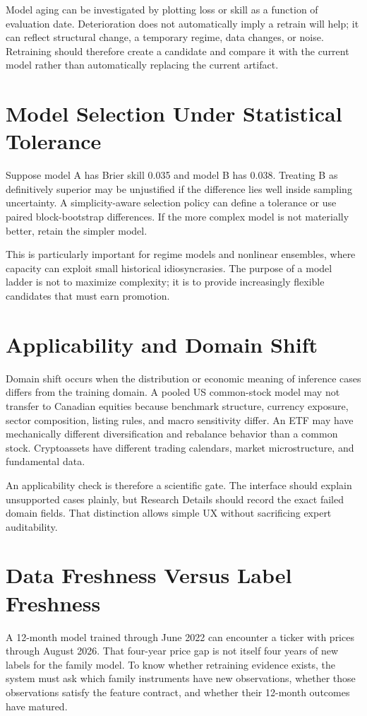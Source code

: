 \documentclass[11pt]{article}
\begin{document}
Model aging can be investigated by plotting loss or skill as a function of evaluation date. Deterioration does not automatically imply a retrain will help; it can reflect structural change, a temporary regime, data changes, or noise. Retraining should therefore create a candidate and compare it with the current model rather than automatically replacing the current artifact.

\section{Model Selection Under Statistical Tolerance}
Suppose model A has Brier skill 0.035 and model B has 0.038. Treating B as definitively superior may be unjustified if the difference lies well inside sampling uncertainty. A simplicity-aware selection policy can define a tolerance or use paired block-bootstrap differences. If the more complex model is not materially better, retain the simpler model.

This is particularly important for regime models and nonlinear ensembles, where capacity can exploit small historical idiosyncrasies. The purpose of a model ladder is not to maximize complexity; it is to provide increasingly flexible candidates that must earn promotion.

\section{Applicability and Domain Shift}
Domain shift occurs when the distribution or economic meaning of inference cases differs from the training domain. A pooled US common-stock model may not transfer to Canadian equities because benchmark structure, currency exposure, sector composition, listing rules, and macro sensitivity differ. An ETF may have mechanically different diversification and rebalance behavior than a common stock. Cryptoassets have different trading calendars, market microstructure, and fundamental data.

An applicability check is therefore a scientific gate. The interface should explain unsupported cases plainly, but Research Details should record the exact failed domain fields. That distinction allows simple UX without sacrificing expert auditability.

\section{Data Freshness Versus Label Freshness}
A 12-month model trained through June 2022 can encounter a ticker with prices through August 2026. That four-year price gap is not itself four years of new labels for the family model. To know whether retraining evidence exists, the system must ask which family instruments have new observations, whether those observations satisfy the feature contract, and whether their 12-month outcomes have matured.
\end{document}
